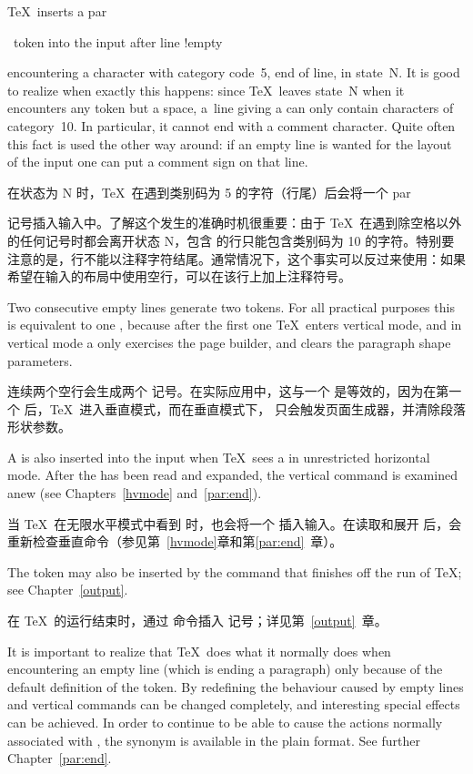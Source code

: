 \TeX\ inserts a \cstoidx par\par\ token into the input after
\term line !empty\par
encountering a character with category code~5,
end of line, in state~{\italic N}.
It is good to realize when exactly this happens:
since \TeX\ leaves state~{\italic N}
when it encounters any token but a space,
a~line giving a  can only contain characters
of category~10. In particular, it cannot end with a comment
character. Quite often this fact is used the other way around:
if an empty line is wanted for the layout of the input
one can put a comment sign on that line.

在状态为 {\italic N} 时，\TeX\ 在遇到类别码为 5 的字符（行尾）后会将一个 \cstoidx par\par 记号插入输入中。了解这个发生的准确时机很重要：由于 \TeX\ 在遇到除空格以外的任何记号时都会离开状态 {\italic N}，包含  的行只能包含类别码为 10 的字符。特别要注意的是，行不能以注释字符结尾。通常情况下，这个事实可以反过来使用：如果希望在输入的布局中使用空行，可以在该行上加上注释符号。

Two consecutive empty lines generate two  tokens.
For all practical purposes this is equivalent to one ,
because after the first one \TeX\ enters vertical mode, and
in vertical mode a  only
exercises the page builder,
and clears the paragraph shape parameters.

连续两个空行会生成两个  记号。在实际应用中，这与一个  是等效的，因为在第一个  后，\TeX\ 进入垂直模式，而在垂直模式下， 只会触发页面生成器，并清除段落形状参数。

A  is also inserted into the input when \TeX\ sees a
 in unrestricted horizontal mode.
After the  has been read and expanded, the
vertical command is examined anew (see Chapters~\ref{hvmode}
and~\ref{par:end}).

当 \TeX\ 在无限水平模式中看到  时，也会将一个  插入输入。在读取和展开  后，会重新检查垂直命令（参见第~\ref{hvmode}章和第\ref{par:end}~章）。

The  token may also be inserted by the 
command that finishes off the run of \TeX; see Chapter~\ref{output}.

在 \TeX\ 的运行结束时，通过  命令插入  记号；详见第~\ref{output}~章。

It is important to realize that \TeX\ does what it normally does
when encountering an empty line
(which is ending a paragraph)
only because of the default definition of the  token.
By redefining  the behaviour
caused by empty lines and vertical commands can be changed completely,
and  interesting special effects can be achieved.
In order to continue to be able  to cause the actions normally
associated with , the synonym  is
available in the plain format. See further Chapter~\ref{par:end}.


